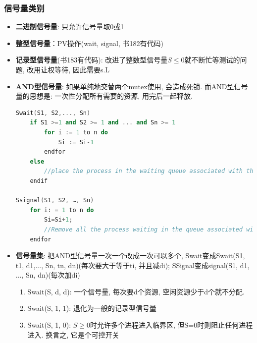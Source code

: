 \documentclass[a4paper, UTF8]{article}
\begin{document}
\subsubsection{信号量类别}
\begin{itemize}
\item \textbf{二进制信号量}: 只允许信号量取0或1
\item \textbf{整型信号量}：PV操作(wait, signal, 书182有代码)
\item \textbf{记录型信号量}(书183有代码): 改进了整数型信号量$S\le 0$就不断忙等测试的问题, 改用让权等待, 因此需要s.L
\item \textbf{AND型信号量}: 如果单纯地交替两个mutex使用, 会造成死锁. 而AND型信号量的思想是: 一次性分配所有需要的资源, 用完后一起释放.
\begin{lstlisting}[language=c++]
Swait(S1, S2,..., Sn)
	if S1 >=1 and S2 >= 1 and ... and Sn >= 1 
		for i := 1 to n do
			Si := Si-1
		endfor
	else
		//place the process in the waiting queue associated with the first Si found with Si＜ 1, and set the program count of this process to the beginning of Swait operation
	endif

Ssignal(S1, S2, …, Sn)
	for i∶ = 1 to n do
		Si=Si+1;
		//Remove all the process waiting in the queue associated with Si into the ready queue.
	endfor
\end{lstlisting}
\item \textbf{信号量集}: 把AND型信号量一次一个改成一次可以多个, Swait变成Swait(S1, t1, d1,..., Sn, tn, dn)(每次要大于等于ti, 并且减di); SSignal变成signal(S1, d1, ..., Sn, dn)(每次加di)
	\begin{enumerate}
	\item Swait(S, d, d): 一个信号量, 每次要d个资源, 空闲资源少于d个就不分配.
	\item Swait(S, 1, 1): 退化为一般的记录型信号量
	\item Swait(S, 1, 0): $S\ge 0$时允许多个进程进入临界区, 但S=0时则阻止任何进程进入. 换言之, 它是个可控开关
	\end{enumerate}
\end{itemize}
\end{document}
